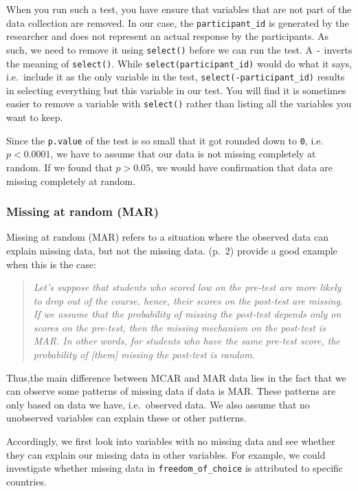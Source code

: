 \documentclass[
]{book}
\begin{document}
When you run such a test, you have ensure that variables that are not part of the data collection are removed. In our case, the \texttt{participant\_id} is generated by the researcher and does not represent an actual response by the participants. As such, we need to remove it using \texttt{select()} before we can run the test. A \texttt{-} inverts the meaning of \texttt{select()}. While \texttt{select(participant\_id)} would do what it says, i.e.~include it as the only variable in the test, \texttt{select(-participant\_id)} results in selecting everything but this variable in our test. You will find it is sometimes easier to remove a variable with \texttt{select()} rather than listing all the variables you want to keep.

Since the \texttt{p.value} of the test is so small that it got rounded down to \texttt{0}, i.e.~\(p<0.0001\), we have to assume that our data is not missing completely at random. If we found that \(p>0.05\), we would have confirmation that data are missing completely at random.

\hypertarget{missing-at-random-mar}{%
\subsubsection{Missing at random (MAR)}\label{missing-at-random-mar}}

Missing at random (MAR) refers to a situation where the observed data can explain missing data, but not the missing data. \citet{dong-et-al-2013} (p.~2) provide a good example when this is the case:

\begin{quote}
\emph{Let's suppose that students who scored low on the pre-test are more likely to drop out of the course, hence, their scores on the post-test are missing. If we assume that the probability of missing the post-test depends only on scores on the pre-test, then the missing mechanism on the post-test is MAR. In other words, for students who have the same pre-test score, the probability of {[}them{]} missing the post-test is random.}
\end{quote}

Thus,the main difference between MCAR and MAR data lies in the fact that we can observe some patterns of missing data if data is MAR. These patterns are only based on data we have, i.e.~observed data. We also assume that no unobserved variables can explain these or other patterns.

Accordingly, we first look into variables with no missing data and see whether they can explain our missing data in other variables. For example, we could investigate whether missing data in \texttt{freedom\_of\_choice} is attributed to specific countries.
\end{document}
